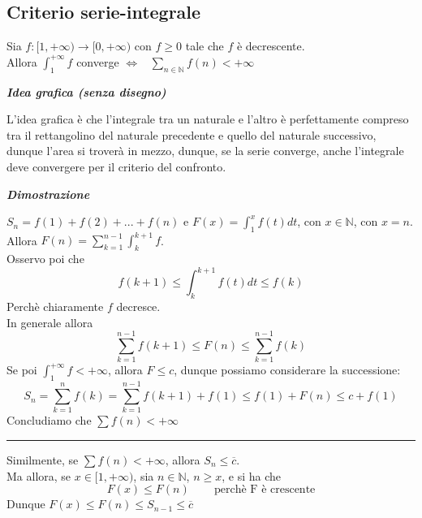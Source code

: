 \documentclass{article}
\theoremstyle{definition}
\newcommand{\N}{\mathbb{N}}
\begin{document}
\subsection{Criterio serie-integrale}
Sia $f: [1,+\infty) \to [0,+\infty)$ con $f \geqslant 0$ tale che $f$ è decrescente.
\\
Allora $\int_1^{+\infty}f$ converge $\Longleftrightarrow  \,\,\,\,\, \sum_{n \in \N}f(n) < +\infty$
\begin{center}
    \textbf{\textit{Idea grafica (senza disegno)}}
\end{center}
L'idea grafica è che l'integrale tra un naturale e l'altro è perfettamente compreso tra il rettangolino del naturale precedente e quello del naturale successivo, dunque l'area si troverà in mezzo, dunque, se la serie converge, anche l'integrale deve convergere per il criterio del confronto.
\begin{center}
    \textbf{\textit{Dimostrazione}}
\end{center}
$S_n=f(1)+f(2)+...+f(n)$ e $F(x)=\int_1^xf(t)dt$, con $x \in \N$, con $x=n$.
\\
Allora $F(n)=\sum_{k=1}^{n-1}\int_k^{k+1}f$.
\\
Osservo poi che 
\begin{equation*}
    f(k+1) \leqslant \int_{k}^{k+1}f(t)dt \leqslant f(k)
\end{equation*}
Perchè chiaramente $f$ decresce.
\\
In generale allora
\begin{equation*}
    \sum_{k=1}^{n-1}f(k+1) \leqslant F(n) \leqslant \sum_{k=1}^{n-1}f(k)
\end{equation*}
Se poi $\int_1^{+\infty} f < +\infty$, allora $F \leqslant c$, dunque possiamo considerare la successione:
\begin{equation*}
    S_n=\sum_{k=1}^n f(k)=\sum_{k=1}^{n-1}f(k+1)+f(1) \leqslant f(1)+F(n) \leqslant c+f(1)
\end{equation*}
Concludiamo che $\sum f(n) < +\infty$
\vspace{15pt}
\hrule
\vspace{15pt}
Similmente, se $\sum f(n) < +\infty$, allora $S_n \leqslant \overline{c}$.
\\
Ma allora, se $x \in [1,+\infty)$, sia $n \in \N$, $n \geqslant x$, e si ha che
\begin{equation*}
    F(x) \leqslant F(n) \,\,\,\,\,\,\,\,\,\,\,\,\, \mbox{perchè F è crescente}
\end{equation*}
Dunque $F(x) \leqslant F(n) \leqslant S_{n-1} \leqslant \overline{c}$
\end{document}
